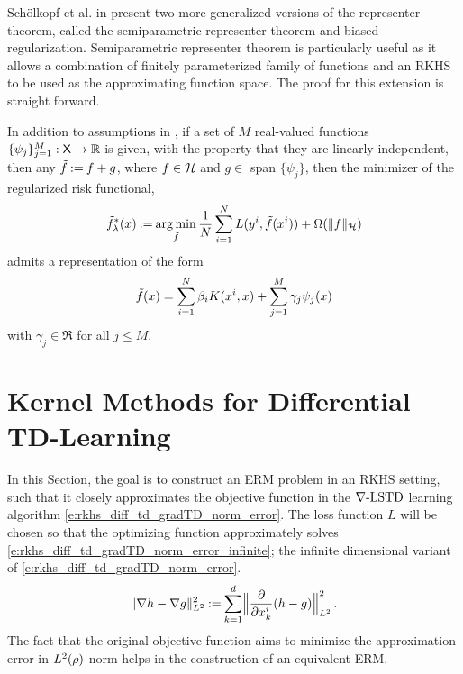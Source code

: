 Sch\"{o}lkopf et al. in \cite{schhersmo01} present two more generalized versions of the representer theorem, called the semiparametric representer theorem and biased regularization. Semiparametric representer theorem is particularly useful as it allows a combination of finitely parameterized family of functions and an RKHS to be used as the approximating function space. The proof for this extension is straight forward.  

\begin{theorem}
In addition to assumptions in , if a set of $M$ real-valued functions $\{\psi_j\}_{j=1}^M : {\sf X} \to \mathbb{R}$ is given, with the property that they are linearly independent, then any $\tilde f \mathbin{:=} f + g$, where $f \in {\cal H}$ and $g \in$ span $\{\psi_j\}$, then the minimizer of the regularized risk functional,
\begin{equation*}
\tilde f^*_\lambda(x) \mathbin{:=} \mathop{\rm arg{\,}min}_{\tilde f} \frac{1}{N} \sum_{i=1}^N L(y^i,\tilde f(x^i)) + \Omega(\|f\|_{\cal H})
\end{equation*}
admits a representation of the form
\begin{equation*}
\tilde f(x) = \sum_{i=1}^N \beta_i K(x^i, x) + \sum_{j=1}^M \gamma_j \psi_j(x)
\end{equation*}
with $\gamma_j \in \Re$ for all $j \leq M$. 
\end{theorem}
\section{Kernel Methods for Differential TD-Learning}
\label{s:kernel_choices}

In this Section, the goal is to construct an ERM problem in an RKHS setting, such that it closely approximates the objective function in the $\nabla\text{-LSTD}$ learning algorithm \eqref{e:rkhs_diff_td_gradTD_norm_error}. The loss function $L$ will be chosen so that the optimizing function approximately solves \eqref{e:rkhs_diff_td_gradTD_norm_error_infinite}; the infinite dimensional variant of \eqref{e:rkhs_diff_td_gradTD_norm_error}. 
\begin{equation}
\| \nabla h -  \nabla g \|^2_{L^2}   \eqdef \sum_{k=1}^d    \Bigl\|  \frac{\partial}{\partial x^i_k} (h-g)  \Bigr\|^2_{L^2}
\, .
\label{e:diff_td_gradTD_norm_error_infinite}
\end{equation}
The fact that the original objective function aims to minimize the approximation error in $L^2(\rho)$ norm helps in the construction of an equivalent ERM.


